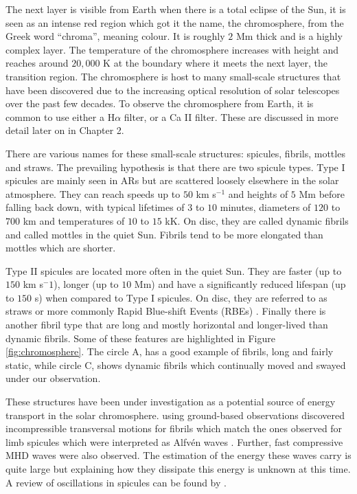     The next layer is visible from Earth when there is a total eclipse of the Sun, it is seen as an intense red region which got it the name, the chromosphere, from the Greek word ``chroma'', meaning colour.
    It is roughly $2$ Mm thick and is a highly complex layer.
    The temperature of the chromosphere increases with height and reaches around $20,000$ K at the boundary where it meets the next layer, the transition region.    
    The chromosphere is host to many small-scale structures that have been discovered due to the increasing optical resolution of solar telescopes over the past few decades.
    To observe the chromosphere from Earth, it is common to use either a H$\alpha$ filter, or a Ca II filter. 
    These are discussed in more detail later on in Chapter 2. 
        
    There are various names for these small-scale structures: spicules, fibrils, mottles and straws.
    The prevailing hypothesis is that there are two spicule types.
    Type I spicules are mainly seen in ARs but are scattered loosely elsewhere in the solar atmosphere.
    They can reach speeds up to $50$ km s$^{-1}$ and heights of $5$ Mm before falling back down, with typical lifetimes of $3$ to $10$ minutes, diameters of $120$ to $700$ km and temperatures of $10$ to $15$ kK.
    On disc, they are called dynamic fibrils and called mottles in the quiet Sun.
    Fibrils tend to be more elongated than mottles which are shorter.
    
    Type II spicules are located more often in the quiet Sun.
    They are faster (up to $150$ km s$^-1$), longer (up to $10$ Mm) and have a significantly reduced lifespan (up to $150$ s) when compared to Type I spicules.
    On disc, they are referred to as straws or more commonly Rapid Blue-shift Events (RBEs) \citep{Zaqarashvili2009}.
    Finally there is another fibril type that are long and mostly horizontal and longer-lived than dynamic fibrils.
    Some of these features are highlighted in Figure \ref{fig:chromosphere}.
    The circle A, has a good example of fibrils, long and fairly static, while circle C, shows dynamic fibrils which continually moved and swayed under our observation.
    
    These structures have been under investigation as a potential source of energy transport in the solar chromosphere.
    \cite{Morton2012} using ground-based observations discovered incompressible transversal motions for fibrils which match the ones observed for limb spicules which were interpreted as Alfv\'en waves \citep{DePontieu2007}.
    Further, fast compressive MHD waves were also observed.
    The estimation of the energy these waves carry is quite large but explaining how they dissipate this energy is unknown at this time.
    A review of oscillations in spicules can be found by \cite{Zaqarashvili2009}. 
      
